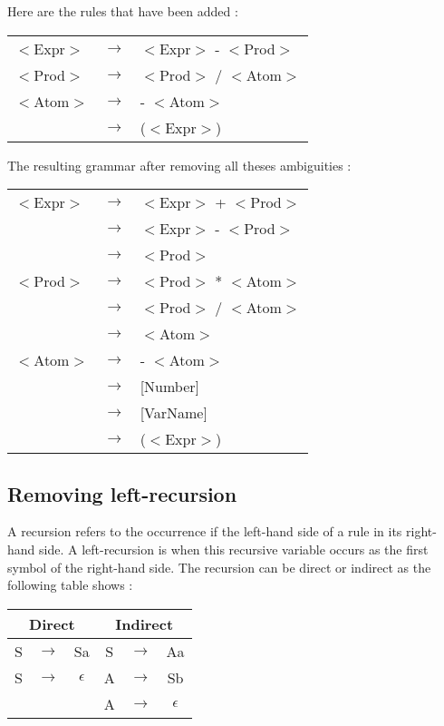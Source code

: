 \documentclass{article}
\begin{document}
\noindent Here are the rules that have been added :
\begin{center}
\begin{tabular}{|m{2cm} m{0.5cm} m{10cm}|}
\hline
$<$Expr$>$& $\to$ & $<$Expr$>$ - $<$Prod$>$\\
$<$Prod$>$ & $\to$ & $<$Prod$>$ / $<$Atom$>$ \\
$<$Atom$>$ & $\to$ & - $<$Atom$>$ \\
& $\to$ & ($<$Expr$>$)\\
\hline
\end{tabular}
\end{center}

\noindent The resulting grammar after removing all theses ambiguities :
\begin{center}
\begin{tabular}{|m{2cm} m{0.5cm} m{10cm}|}
\hline
$<$Expr$>$ & $\to$ & $<$Expr$>$ + $<$Prod$>$\\
& $\to$ & $<$Expr$>$ - $<$Prod$>$\\
& $\to$ & $<$Prod$>$\\
$<$Prod$>$ & $\to$ &$<$Prod$>$ * $<$Atom$>$ \\
& $\to$ & $<$Prod$>$ / $<$Atom$>$ \\
& $\to$ & $<$Atom$>$\\
$<$Atom$>$ & $\to$ & - $<$Atom$>$ \\
& $\to$ & [Number]\\
& $\to$ & [VarName]\\
& $\to$ & ($<$Expr$>$)\\
\hline
\end{tabular}
\end{center}

\subsection{Removing left-recursion}
A recursion refers to the occurrence if the left-hand side of a rule in its right-hand side. A left-recursion is when this recursive variable occurs as the first symbol of the right-hand side. The recursion can be direct or indirect as the following table shows :

\begin{center}
\begin{tabular}{|c c c | c c c|}
\hline
\multicolumn{3}{|c|}{Direct} & \multicolumn{3}{|c|}{Indirect} \\
\hline\hline
S & $\to$ & Sa & S & $\to$ & Aa \\
S & $\to$ & $\epsilon$ & A & $\to$ & Sb \\
& & & A & $\to$ & $\epsilon$ \\
\hline
\end{tabular}
\end{center}
\end{document}
